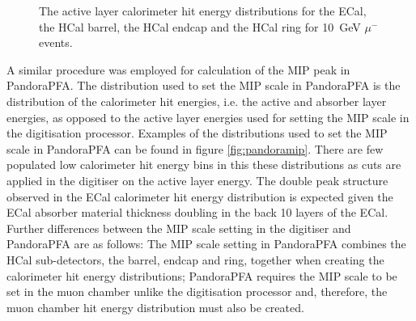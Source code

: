 \begin{figure}[h!]
\caption[The active layer calorimeter hit energy distributions for \protect{} the ECal, \protect{} the HCal barrel, \protect{} the HCal endcap and \protect{} the HCal ring for 10~GeV $\mu^{-}$ events.]{The active layer calorimeter hit energy distributions for \protect{} the ECal, \protect{} the HCal barrel, \protect{} the HCal endcap and \protect{} the HCal ring for 10~GeV $\mu^{-}$ events.}
\label{fig:digitisermip}
\end{figure}

A similar procedure was employed for calculation of the MIP peak in PandoraPFA.  The distribution used to set the MIP scale in PandoraPFA is the distribution of the calorimeter hit energies, i.e. the active and absorber layer energies, as opposed to the active layer energies used for setting the MIP scale in the digitisation processor.   Examples of the distributions used to set the MIP scale in PandoraPFA can be found in figure \ref{fig:pandoramip}.  There are few populated low calorimeter hit energy bins in this these distributions as cuts are applied in the digitiser on the active layer energy.  The double peak structure observed in the ECal calorimeter hit energy distribution is expected given the ECal absorber material thickness doubling in the back 10 layers of the ECal.  Further differences between the MIP scale setting in the digitiser and PandoraPFA are as follows: The MIP scale setting in PandoraPFA combines the HCal sub-detectors, the barrel, endcap and ring, together when creating the calorimeter hit energy distributions; PandoraPFA requires the MIP scale to be set in the muon chamber unlike the digitisation processor and, therefore, the muon chamber hit energy distribution must also be created.  

